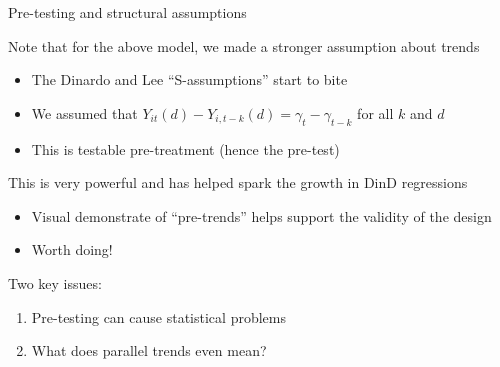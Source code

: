 \documentclass[notes,11pt, aspectratio=169]{beamer}
\newenvironment{wideitemize}{\itemize\addtolength{\itemsep}{10pt}}{\enditemize}
\begin{document}
\begin{frame}{Pre-testing and structural assumptions}
  \begin{wideitemize}
  \item Note that for the above model, we made a stronger assumption about trends
    \begin{itemize}
    \item  The Dinardo and Lee ``S-assumptions'' start to bite
    \item We assumed that
      $Y_{it}(d) - Y_{i,t-k}(d) = \gamma_{t} - \gamma_{t-k}$ for all
      $k$ and $d$
    \item This is testable pre-treatment (hence the pre-test)
    \end{itemize}
  \item This is very powerful and has helped spark the growth in DinD regressions
    \begin{itemize}
    \item Visual demonstrate of ``pre-trends'' helps support the
      validity of the design
    \item Worth doing!
    \end{itemize}
  \item Two key issues:
    \begin{enumerate}
    \item Pre-testing can cause statistical problems
    \item What does parallel trends even mean?
    \end{enumerate}
  \end{wideitemize}
\end{frame}
\end{document}
